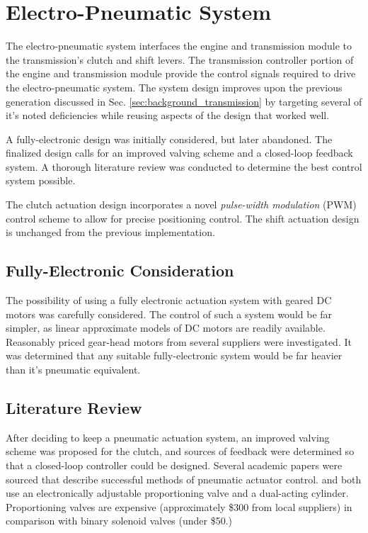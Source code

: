 \section{Electro-Pneumatic System}

The electro-pneumatic system interfaces the engine and transmission module to the transmission's clutch and shift levers. The transmission controller portion of the engine and transmission module provide the control signals required to drive the electro-pneumatic system. The system design improves upon the previous generation discussed in Sec. \ref{sec:background_transmission} by targeting several of it's noted deficiencies while reusing aspects of the design that worked well.

A fully-electronic design was initially considered, but later abandoned. The finalized design calls for an improved valving scheme and a closed-loop feedback system. A thorough literature review was conducted to determine the best control system possible. 

The clutch actuation design incorporates a novel \emph{pulse-width modulation} (PWM) control scheme to allow for precise positioning control. The shift actuation design is unchanged from the previous implementation. 

\subsection{Fully-Electronic Consideration}

The possibility of using a fully electronic actuation system with geared DC motors was carefully considered. The control of such a system would be far simpler, as linear approximate models of DC motors are readily available. Reasonably priced gear-head motors from several suppliers were investigated. It was determined that any suitable fully-electronic system would be far heavier than it's pneumatic equivalent.

\subsection{Literature Review}

After deciding to keep a pneumatic actuation system, an improved valving scheme was proposed for the clutch, and sources of feedback were determined so that a closed-loop controller could be designed. Several academic papers were sourced that describe successful methods of pneumatic actuator control.  and \citet{adaptive_pneumatic} both use an electronically adjustable proportioning valve and a dual-acting cylinder. Proportioning valves are expensive (approximately \$300 from local suppliers) in comparison with binary solenoid valves (under \$50.)

